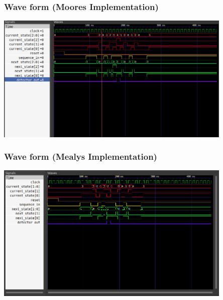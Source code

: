 \documentclass[xcolor=table]{beamer}
\begin{document}
\begin{frame}
  \frametitle{Wave form (Moores Implementation)}
  \centering
  \includegraphics[width=0.85\textwidth, height=0.65\textheight]{./static/res_wave_moore.png}
\end{frame}

\begin{frame}
  \frametitle{Wave form (Mealys Implementation)}
  \centering
  \includegraphics[width=0.85\textwidth, height=0.65\textheight]{./static/res_wave_mealy.png}
\end{frame}
\end{document}
